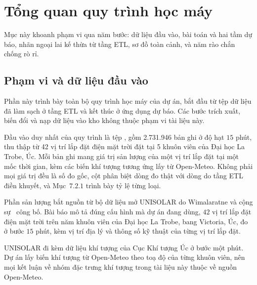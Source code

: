 %

\FloatBarrier
\section{Tổng quan quy trình học máy}

Mục này khoanh phạm vi qua năm bước: dữ liệu đầu vào, bài toán và hai tầm dự báo, nhãn
ngoại lai kế thừa từ tầng ETL, sơ đồ toàn cảnh, và năm rào chắn chống rò rỉ.

\FloatBarrier
\subsection{Phạm vi và dữ liệu đầu vào}

Phần này trình bày toàn bộ quy trình học máy của dự án, bắt đầu từ tệp dữ liệu đã
làm sạch ở tầng ETL và kết thúc ở ứng dụng dự báo. Các bước trích xuất, biến đổi và
nạp dữ liệu vào kho không thuộc phạm vi tài liệu này.

Đầu vào duy nhất của quy trình là tệp ,
gồm 2.731.946 bản ghi ở độ hạt $15$ phút, thu thập từ 42 vị trí lắp đặt điện mặt trời
đặt tại 5 khuôn viên của Đại học La Trobe, Úc. Mỗi bản ghi mang
giá trị sản lượng của một vị trí lắp đặt tại một mốc thời gian, kèm các biến khí tượng tương ứng lấy từ
Open-Meteo. Không phải mọi giá trị đều là số đo gốc, cột  phân biệt dòng
đo thật với dòng do tầng ETL điền khuyết, và Mục~$7.2.1$ trình bày tỷ lệ từng loại.

Phần sản lượng bắt nguồn từ bộ dữ liệu mở UNISOLAR do Wimalaratne và cộng
sự~\cite{wimalaratne2022unisolar} công bố. Bài báo mô tả đúng cấu hình mà dự án đang
dùng, $42$ vị trí lắp đặt điện mặt trời trên năm khuôn viên của Đại học La Trobe, bang Victoria,
Úc, đo ở bước $15$ phút, kèm vị trí địa lý và thông số kỹ thuật của từng vị trí lắp đặt.

UNISOLAR đi kèm dữ liệu khí tượng của Cục Khí tượng Úc ở bước một phút. Dự án lấy biến
khí tượng từ Open-Meteo theo toạ độ của từng khuôn viên, nên mọi kết luận về
nhóm đặc trưng khí tượng trong tài liệu này thuộc về nguồn Open-Meteo.

